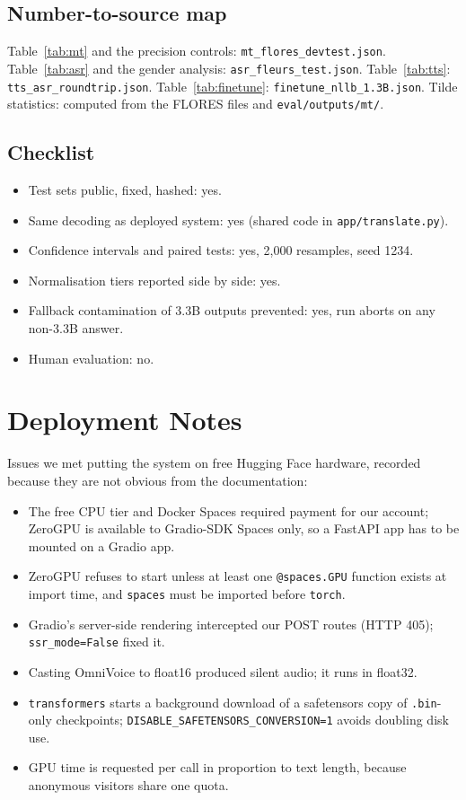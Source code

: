 \subsection{Number-to-source map}
Table~\ref{tab:mt} and the precision controls: \texttt{mt\_flores\_devtest.json}. Table~\ref{tab:asr} and the gender analysis: \texttt{asr\_fleurs\_test.json}. Table~\ref{tab:tts}: \texttt{tts\_asr\_roundtrip.json}. Table~\ref{tab:finetune}: \texttt{finetune\_nllb\_1.3B.json}. Tilde statistics: computed from the FLORES files and \texttt{eval/outputs/mt/}.

\subsection{Checklist}
\begin{itemize}\itemsep0pt
  \item Test sets public, fixed, hashed: yes.
  \item Same decoding as deployed system: yes (shared code in \texttt{app/translate.py}).
  \item Confidence intervals and paired tests: yes, 2,000 resamples, seed 1234.
  \item Normalisation tiers reported side by side: yes.
  \item Fallback contamination of 3.3B outputs prevented: yes, run aborts on any non-3.3B answer.
  \item Human evaluation: no.
\end{itemize}

\section{Deployment Notes}
\label{app:deploy}

Issues we met putting the system on free Hugging Face hardware, recorded because they are not obvious from the documentation:
\begin{itemize}\itemsep0pt
  \item The free CPU tier and Docker Spaces required payment for our account; ZeroGPU is available to Gradio-SDK Spaces only, so a FastAPI app has to be mounted on a Gradio app.
  \item ZeroGPU refuses to start unless at least one \texttt{@spaces.GPU} function exists at import time, and \texttt{spaces} must be imported before \texttt{torch}.
  \item Gradio's server-side rendering intercepted our POST routes (HTTP 405); \texttt{ssr\_mode=False} fixed it.
  \item Casting OmniVoice to float16 produced silent audio; it runs in float32.
  \item \texttt{transformers} starts a background download of a safetensors copy of \texttt{.bin}-only checkpoints; \texttt{DISABLE\_SAFETENSORS\_CONVERSION=1} avoids doubling disk use.
  \item GPU time is requested per call in proportion to text length, because anonymous visitors share one quota.
\end{itemize}

